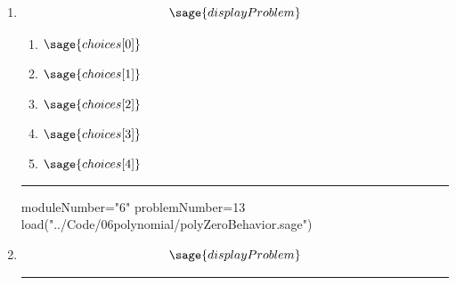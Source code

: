\documentclass[14pt]{extbook}
\newcommand{\litem}[1]{\item#1\hspace*{-1cm}\rule{\textwidth}{0.4pt}}
\begin{document}
\begin{enumerate}
\litem{ 

   \[ \sage{displayProblem} \]

  	\begin{enumerate}[label=\Alph*.]
    \item \( \sage{choices[0]} \)
    \item \( \sage{choices[1]} \)
    \item \( \sage{choices[2]} \)
    \item \( \sage{choices[3]} \)
    \item \( \sage{choices[4]} \)
  	\end{enumerate}
  }

\begin{sagesilent}
moduleNumber="6"
problemNumber=13
load("../Code/06polynomial/polyZeroBehavior.sage")
\end{sagesilent}

\litem{ 

\[ \sage{displayProblem} \]

}
\end{enumerate}
\end{document}
